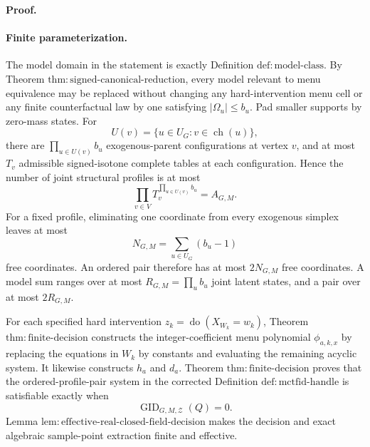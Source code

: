 \textbf{Proof.}
\paragraph{Finite parameterization.}
The model domain in the statement is exactly Definition \(\mathrm{def:model\text{-}class}\).  By Theorem \(\mathrm{thm:signed\text{-}canonical\text{-}reduction}\), every model relevant to menu equivalence may be replaced without changing any hard-intervention menu cell or any finite counterfactual law by one satisfying \(|\Omega_u|\le b_u\).  Pad smaller supports by zero-mass states.  For
\[
 U(v)=\{u\in U_G:v\in\operatorname{ch}(u)\},
\]
there are \(\prod_{u\in U(v)}b_u\) exogenous-parent configurations at vertex \(v\), and at most \(T_v\) admissible signed-isotone complete tables at each configuration.  Hence the number of joint structural profiles is at most
\[
 \prod_{v\in V}T_v^{\prod_{u\in U(v)}b_u}=A_{G,M}.
\tag{1}
\]
For a fixed profile, eliminating one coordinate from every exogenous simplex leaves at most
\[
 N_{G,M}=\sum_{u\in U_G}(b_u-1)
\tag{2}
\]
free coordinates.  An ordered pair therefore has at most \(2N_{G,M}\) free coordinates.  A model sum ranges over at most \(R_{G,M}=\prod_ub_u\) joint latent states, and a pair over at most \(2R_{G,M}\).

For each specified hard intervention \(z_k=\operatorname{do}(X_{W_k}=w_k)\), Theorem \(\mathrm{thm:finite\text{-}decision}\) constructs the integer-coefficient menu polynomial \(\phi_{a,k,x}\) by replacing the equations in \(W_k\) by constants and evaluating the remaining acyclic system.  It likewise constructs \(h_a\) and \(d_a\).  Theorem \(\mathrm{thm:finite\text{-}decision}\) proves that the ordered-profile-pair system in the corrected Definition \(\mathrm{def:mctfid\text{-}handle}\) is satisfiable exactly when
\[
 \operatorname{GID}_{G,M,\mathcal Z}(Q)=0.
\tag{3}
\]
Lemma \(\mathrm{lem:effective\text{-}real\text{-}closed\text{-}field\text{-}decision}\) makes the decision and exact algebraic sample-point extraction finite and effective.

